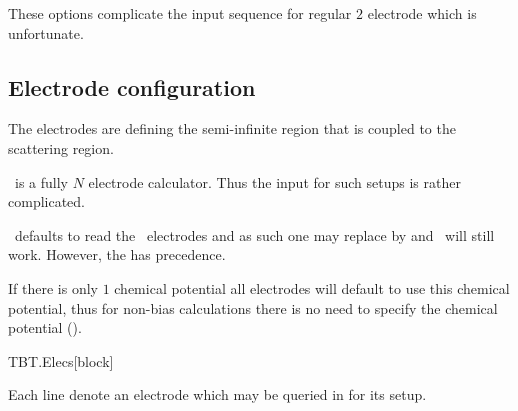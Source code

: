 These options complicate the input sequence for regular $2$ electrode
which is unfortunate. 



\subsection{Electrode configuration}

The electrodes are defining the semi-infinite region that is coupled
to the scattering region.

\tbtrans\ is a fully $N$ electrode calculator. Thus the input for such
setups is rather complicated.

\tbtrans\ defaults to read the \tsiesta\ electrodes and as such one
may replace  by  and \tbtrans\ will still
work. However, the  has precedence. 

If there is only $1$ chemical potential all electrodes will default
to use this chemical potential, thus for non-bias calculations there
is no need to specify the chemical potential
().  

\begin{fdfentry}{TBT.Elecs}[block]

  Each line denote an electrode which may be queried in
   for its setup.
  
\end{fdfentry}

